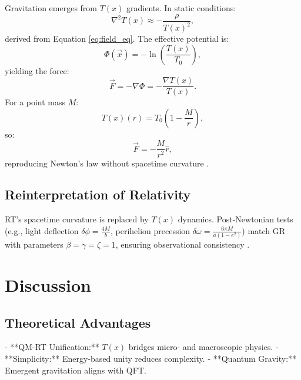 \documentclass[12pt,a4paper]{article}
\newcommand{\Tfield}{T(x)}
\newcommand{\Tzero}{T_0}
\newcommand{\vecx}{\vec{x}}
\begin{document}
	Gravitation emerges from \(\Tfield\) gradients. In static conditions:
	\begin{equation}
		\nabla^2\Tfield \approx -\frac{\rho}{\Tfield^2},
		\label{eq:static_field}
	\end{equation}
	derived from Equation \ref{eq:field_eq}. The effective potential is:
	\begin{equation}
		\Phi(\vecx) = -\ln\left(\frac{\Tfield}{\Tzero}\right),
		\label{eq:grav_potential_def}
	\end{equation}
	yielding the force:
	\begin{equation}
		\vec{F} = -\nabla\Phi = -\frac{\nabla\Tfield}{\Tfield}.
		\label{eq:force_from_potential}
	\end{equation}
	For a point mass \(M\):
	\begin{equation}
		\Tfield(r) = \Tzero\left(1 - \frac{M}{r}\right),
		\label{eq:time_field_point_mass}
	\end{equation}
	so:
	\begin{equation}
		\vec{F} = -\frac{M}{r^2} \hat{r},
		\label{eq:newton_law}
	\end{equation}
	reproducing Newton’s law without spacetime curvature \cite{pascher_emergente_2025}.
	
	\subsection{Reinterpretation of Relativity}
	\label{subsec:rt_reinterpretation}
	
	RT’s spacetime curvature is replaced by \(\Tfield\) dynamics. Post-Newtonian tests (e.g., light deflection \(\delta\phi = \frac{4M}{b}\), perihelion precession \(\delta\omega = \frac{6\pi M}{a(1-e^2)}\)) match GR with parameters \(\beta = \gamma = \zeta = 1\), ensuring observational consistency \cite{Will2014}.
	
	\section{Discussion}
	\label{sec:discussion}
	
	\subsection{Theoretical Advantages}
	- **QM-RT Unification:** \(\Tfield\) bridges micro- and macroscopic physics.
	- **Simplicity:** Energy-based unity reduces complexity.
	- **Quantum Gravity:** Emergent gravitation aligns with QFT.
	
\end{document}
